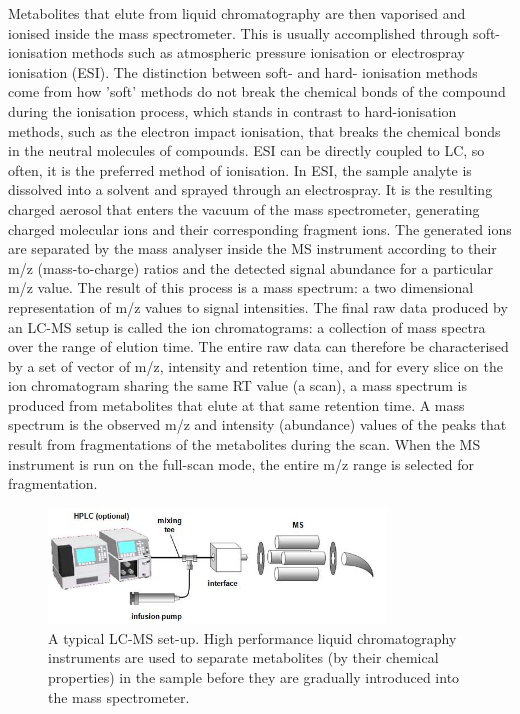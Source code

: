 Metabolites that elute from liquid chromatography are then vaporised and ionised inside the mass spectrometer. This is usually accomplished through soft-ionisation methods such as atmospheric pressure ionisation or electrospray ionisation (ESI). The distinction between soft- and hard- ionisation methods come from how 'soft' methods do not break the chemical bonds of the compound during the ionisation process, which stands in contrast to hard-ionisation methods, such as the electron impact ionisation, that breaks the chemical bonds in the neutral molecules of compounds. ESI can be directly coupled to LC, so often, it is the preferred method of ionisation. In ESI, the sample analyte is dissolved into a solvent and sprayed through an electrospray. It is the resulting charged aerosol that enters the vacuum of the mass spectrometer, generating charged molecular ions and their corresponding fragment ions. The generated ions are separated by the mass analyser inside the MS instrument according to their m/z (mass-to-charge) ratios and the detected signal abundance for a particular m/z value. The result of this process is a mass spectrum: a two dimensional representation of m/z values to signal intensities. The final raw data produced by an LC-MS setup is called the ion chromatograms: a collection of mass spectra over the range of elution time. The entire raw data can therefore be characterised by a set of vector of m/z, intensity and retention time, and for every slice on the ion chromatogram sharing the same RT value (a scan), a mass spectrum is produced from metabolites that elute at that same retention time. A mass spectrum is the observed m/z and intensity (abundance) values of the peaks that result from fragmentations of the metabolites during the scan. When the MS instrument is run on the full-scan mode, the entire m/z range is selected for fragmentation. 

\begin{figure}[htb!]
\noindent \begin{centering}
\includegraphics[width=0.8\textwidth]{02-background/figures/Fig-1}
\par\end{centering}
\caption{\label{fig:LC-MS-setup}A typical LC-MS set-up. High performance liquid chromatography instruments are used to separate metabolites (by their chemical properties) in the sample before they are gradually introduced into the mass spectrometer.}
\end{figure}

